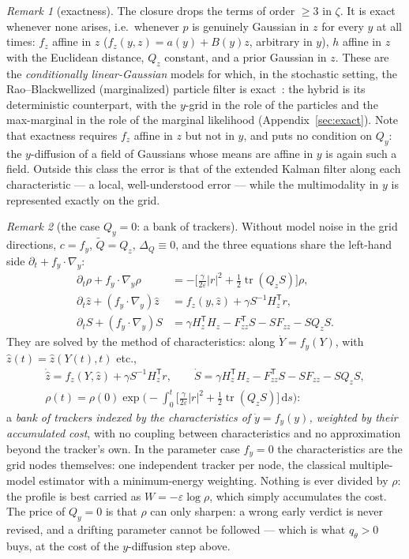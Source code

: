 \documentclass[11pt,a4paper]{article}
\newcommand{\dd}{\,\mathrm{d}}
\newcommand{\tr}{\operatorname{tr}}
\newcommand{\T}{^{\mathsf T}}
\newcommand{\zh}{\hat{z}}
\newcommand{\eps}{\varepsilon}
\newcommand{\abs}[1]{\left\lvert #1 \right\rvert}
\newcommand{\gy}{\nabla_{\!y}}
\theoremstyle{plain}
\theoremstyle{definition}
\theoremstyle{remark}
\newtheorem{remark}{Remark}
\begin{document}
\begin{remark}[exactness]
The closure drops the terms of order $\ge3$ in $\zeta$. It is exact whenever none arises, i.e.\ whenever $p$ is genuinely Gaussian in $z$ for every $y$ at all times: $f_z$ affine in $z$ ($f_z(y,z) = a(y)+B(y)z$, arbitrary in $y$), $h$ affine in $z$ with the Euclidean distance, $Q_z$ constant, and a prior Gaussian in $z$. These are the \emph{conditionally linear-Gaussian} models for which, in the stochastic setting, the Rao--Blackwellized (marginalized) particle filter is exact~\cite{Doucet2000,Schon2005}: the hybrid is its deterministic counterpart, with the $y$-grid in the role of the particles and the max-marginal in the role of the marginal likelihood (Appendix~\ref{sec:exact}). Note that exactness requires $f_z$ affine in $z$ but not in $y$, and puts no condition on $Q_y$: the $y$-diffusion of a field of Gaussians whose means are affine in $y$ is again such a field. Outside this class the error is that of the extended Kalman filter along each characteristic --- a local, well-understood error --- while the multimodality in $y$ is represented exactly on the grid.
\end{remark}

\begin{remark}[the case $Q_y=0$: a bank of trackers]
Without model noise in the grid directions, $c=f_y$, $\tilde Q = Q_z$, $\Delta_Q\equiv0$, and the three equations share the left-hand side $\partial_t + f_y\cdot\gy$:
\begin{align*}
  \partial_t\rho + f_y\cdot\gy\rho &= -\Big[\frac{\gamma}{2\eps}\abs r^2 + \frac12\tr(Q_zS)\Big]\rho, \\
  \partial_t\zh + (f_y\cdot\gy)\zh &= f_z(y,\zh) + \gamma S^{-1}H_z\T r, \\
  \partial_tS + (f_y\cdot\gy)S &= \gamma H_z\T H_z - F_{zz}\T S - SF_{zz} - SQ_zS .
\end{align*}
They are solved by the method of characteristics: along $\dot Y = f_y(Y)$, with $\zh(t)=\zh(Y(t),t)$ etc.,
\begin{gather*}
  \dot{\zh} = f_z(Y,\zh) + \gamma S^{-1}H_z\T r, \qquad
  \dot S = \gamma H_z\T H_z - F_{zz}\T S - SF_{zz} - SQ_zS, \\
  \rho(t) = \rho(0)\exp\Big(-\!\int_0^t\Big[\frac{\gamma}{2\eps}\abs r^2 + \frac12\tr(Q_zS)\Big]\dd s\Big):
\end{gather*}
a \emph{bank of trackers indexed by the characteristics of $\dot y=f_y(y)$, weighted by their accumulated cost}, with no coupling between characteristics and no approximation beyond the tracker's own. In the parameter case $f_y=0$ the characteristics are the grid nodes themselves: one independent tracker per node, the classical multiple-model estimator with a minimum-energy weighting. Nothing is ever divided by $\rho$: the profile is best carried as $W=-\eps\log\rho$, which simply accumulates the cost. The price of $Q_y=0$ is that $\rho$ can only sharpen: a wrong early verdict is never revised, and a drifting parameter cannot be followed --- which is what $q_\theta>0$ buys, at the cost of the $y$-diffusion step above.
\end{remark}
\end{document}
